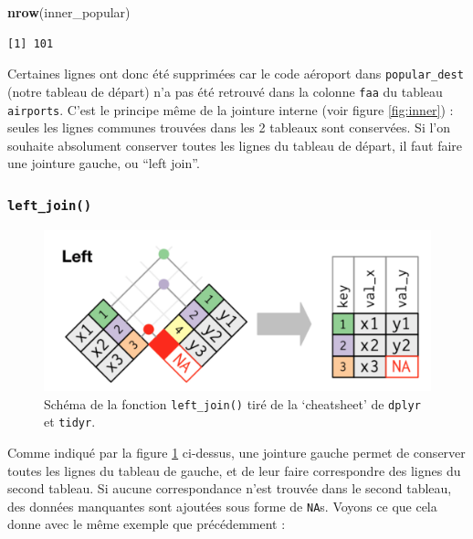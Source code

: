 \documentclass[a4paperpaper,]{article}
\newenvironment{Shaded}{\begin{snugshade}}{\end{snugshade}}
\newcommand{\DataTypeTok}[1]{\textcolor[rgb]{0.00,0.34,0.68}{#1}}
\newcommand{\KeywordTok}[1]{\textcolor[rgb]{0.12,0.11,0.11}{\textbf{#1}}}
\newcommand{\NormalTok}[1]{\textcolor[rgb]{0.12,0.11,0.11}{#1}}
\newcommand{\OperatorTok}[1]{\textcolor[rgb]{0.12,0.11,0.11}{#1}}
\newcommand{\StringTok}[1]{\textcolor[rgb]{0.75,0.01,0.01}{#1}}
\begin{document}
\begin{Shaded}
\begin{Highlighting}[]
\KeywordTok{nrow}\NormalTok{(inner_popular)}
\end{Highlighting}
\end{Shaded}

\begin{verbatim}
[1] 101
\end{verbatim}

Certaines lignes ont donc été supprimées car le code aéroport dans \texttt{popular\_dest} (notre tableau de départ) n'a pas été retrouvé dans la colonne \texttt{faa} du tableau \texttt{airports}. C'est le principe même de la jointure interne (voir figure \ref{fig:inner}) : seules les lignes communes trouvées dans les 2 tableaux sont conservées. Si l'on souhaite absolument conserver toutes les lignes du tableau de départ, il faut faire une jointure gauche, ou ``left join''.

\hypertarget{left_join}{%
\subsubsection{\texorpdfstring{\texttt{left\_join()}}{left\_join()}}\label{left_join}}

\begin{figure}[htpb]

{\centering \includegraphics[width=0.5\linewidth]{images/leftjoin} 

}

\caption{Schéma de la fonction \texttt{left\_join()} tiré de la `cheatsheet' de \texttt{dplyr} et \texttt{tidyr}.}\label{fig:left}
\end{figure}



Comme indiqué par la figure \ref{fig:left} ci-dessus, une jointure gauche permet de conserver toutes les lignes du tableau de gauche, et de leur faire correspondre des lignes du second tableau. Si aucune correspondance n'est trouvée dans le second tableau, des données manquantes sont ajoutées sous forme de \texttt{NA}s. Voyons ce que cela donne avec le même exemple que précédemment :

\begin{Shaded}
\end{Shaded}
\end{document}
